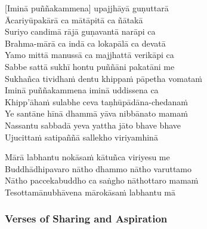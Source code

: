 [Iminā puññakammena] upajjhāyā guṇuttarā\\
Ācariyūpakārā ca mātāpitā ca ñātakā\\
Suriyo candimā rājā guṇavantā narāpi ca\\
Brahma-mārā ca indā ca lokapālā ca devatā\\
Yamo mittā manussā ca majjhattā verikāpi ca\\
Sabbe sattā sukhī hontu puññāni pakatāni me\\
Sukhañca tividhaṁ dentu khippaṁ pāpetha vomataṁ\\
Iminā puññakammena iminā uddissena ca\\
Khipp'āhaṁ sulabhe ceva taṇhūpādāna-chedanaṁ\\
Ye santāne hīnā dhammā yāva nibbānato mamaṁ\\
Nassantu sabbadā yeva yattha jāto bhave bhave\\
Ujucittaṁ satipaññā sallekho viriyamhinā

\clearpage

Mārā labhantu nokāsaṁ kātuñca viriyesu me\\
Buddhādhipavaro nātho dhammo nātho varuttamo\\
Nātho paccekabuddho ca saṅgho nāthottaro mamaṁ\\
Tesottamānubhāvena mārokāsaṁ labhantu mā\\


%

\subsubsection{Verses of Sharing and Aspiration}

\enlargethispage{\baselineskip}

\begin{leader}
\end{leader}


